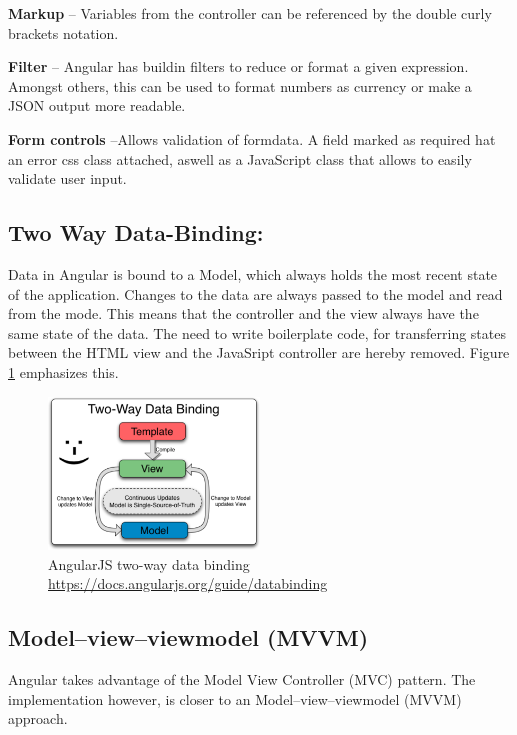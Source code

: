\noindent\textbf{Markup} -- Variables from the controller can be referenced by the double curly brackets notation.

\noindent\textbf{Filter} -- Angular has buildin filters to reduce or format a given expression. Amongst others, this can be used to format numbers as currency or make a JSON output more readable.

\noindent\textbf{Form controls} --Allows validation of formdata. A field marked as required hat an error css class attached, aswell as a JavaScript class that allows to easily validate user input.\vspace{1ex}


\subsection{Two Way Data-Binding:}
\label{sec:tw-binding}
Data in Angular is bound to a Model, which always holds the most recent state of the application. Changes to the data are always passed to the model and read from the mode. This means that the controller and the view always have the same state of the data. The need to write boilerplate code, for transferring states between the HTML view and the JavaSript controller are hereby removed. Figure \ref{fig:tw-databinding} emphasizes this.

\begin{figure}[H]
	\centering\includegraphics[width=0.5\textwidth]{res/Two_Way_Data_Binding}
	\caption{AngularJS two-way data binding \url{https://docs.angularjs.org/guide/databinding}}
	\label{fig:tw-databinding}
\end{figure}


\subsection{Model–view–viewmodel (MVVM)}
Angular takes advantage of the Model View Controller (MVC) pattern. The implementation however, is closer to an Model–view–viewmodel (MVVM) approach. 

